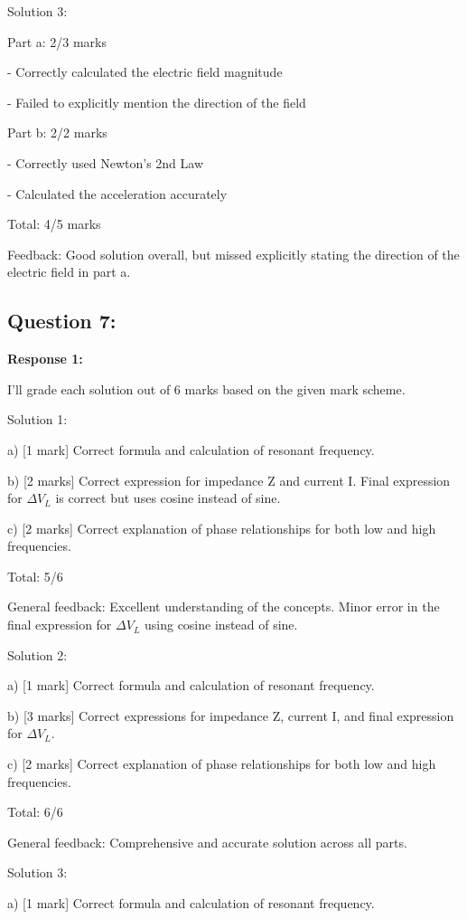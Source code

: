 \documentclass[a4paper,11pt]{article}
\begin{document}
Solution 3:

Part a: 2/3 marks

- Correctly calculated the electric field magnitude

- Failed to explicitly mention the direction of the field

Part b: 2/2 marks

- Correctly used Newton's 2nd Law

- Calculated the acceleration accurately

Total: 4/5 marks

Feedback: Good solution overall, but missed explicitly stating the direction of the electric field in part a.


\subsection*{Question 7:}

\textbf{Response 1:}

I'll grade each solution out of 6 marks based on the given mark scheme.

Solution 1:

a) [1 mark] Correct formula and calculation of resonant frequency.

b) [2 marks] Correct expression for impedance Z and current I. Final expression for \(\Delta V_L \) is correct but uses cosine instead of sine.

c) [2 marks] Correct explanation of phase relationships for both low and high frequencies.

Total: 5/6

General feedback: Excellent understanding of the concepts. Minor error in the final expression for \(\Delta V_L \) using cosine instead of sine.

Solution 2:

a) [1 mark] Correct formula and calculation of resonant frequency.

b) [3 marks] Correct expressions for impedance Z, current I, and final expression for \(\Delta V_L \).

c) [2 marks] Correct explanation of phase relationships for both low and high frequencies.

Total: 6/6

General feedback: Comprehensive and accurate solution across all parts.

Solution 3:

a) [1 mark] Correct formula and calculation of resonant frequency.
\end{document}
